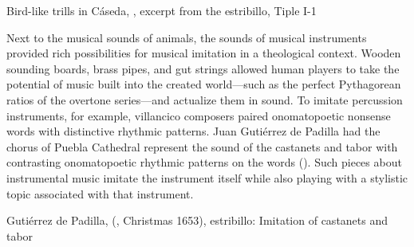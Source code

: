 
\begin{musicexample}
    \caption{Bird-like trills in Cáseda, , excerpt
    from the estribillo, Tiple I-1}
    \label{mus:CasedaJ-Sagrado_pajarillo}
\end{musicexample}

Next to the musical sounds of animals, the sounds of musical instruments
provided rich possibilities for musical imitation in a theological context.
Wooden sounding boards, brass pipes, and gut strings allowed human players to
take the potential of music built into the created world---such as the perfect
Pythagorean ratios of the overtone series---and actualize them in sound.
To imitate percussion instruments, for example, villancico composers paired
onomatopoetic nonsense words with distinctive rhythmic patterns.
Juan Gutiérrez de Padilla had the chorus of Puebla Cathedral represent the
sound of the castanets and tabor with contrasting onomatopoetic rhythmic
patterns on the words  ().
Such pieces about instrumental music imitate the instrument itself while also
playing with a stylistic topic associated with that instrument.


\begin{musicexample}
    \caption{Gutiérrez de Padilla, 
    (, Christmas 1653), estribillo: Imitation of
    castanets and tabor}
    \label{mus:Padilla-Alto_zagales-chaz}
\end{musicexample}

